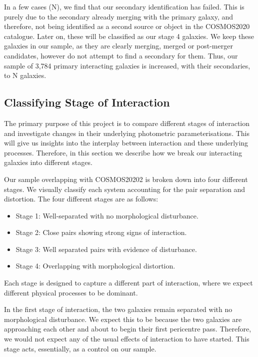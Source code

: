 \documentclass[fleqn,usenatbib]{mnras}
\begin{document}
In a few cases (N), we find that our secondary identification has failed. This is purely due to the secondary already merging with the primary galaxy, and therefore, not being identified as a second source or object in the COSMOS2020 catalogue. Later on, these will be classified as our stage 4 galaxies. We keep these galaxies in our sample, as they are clearly merging, merged or post-merger candidates, however do not attempt to find a secondary for them. Thus, our sample of 3,784 primary interacting galaxies is increased, with their secondaries, to N galaxies.

\subsection{Classifying Stage of Interaction}
The primary purpose of this project is to compare different stages of interaction and investigate changes in their underlying photometric parameterisations. This will give us insights into the interplay between interaction and these underlying processes. Therefore, in this section we describe how we break our interacting galaxies into different stages. 

Our sample overlapping with COSMOS20202 is broken down into four different stages. We visually classify each system accounting for the pair separation and distortion. The four different stages are as follows:


\begin{itemize}
    \item Stage 1: Well-separated with no morphological disturbance.
    \item Stage 2: Close pairs showing strong signs of interaction.
    \item Stage 3: Well separated pairs with evidence of disturbance.
    \item Stage 4: Overlapping with morphological distortion.
\end{itemize}


\noindent Each stage is designed to capture a different part of interaction, where we expect different physical processes to be dominant.

In the first stage of interaction, the two galaxies remain separated with no morphological disturbance. We expect this to be because the two galaxies are approaching each other and about to begin their first pericentre pass. Therefore, we would not expect any of the usual effects of interaction to have started. This stage acts, essentially, as a control on our sample.
\end{document}
